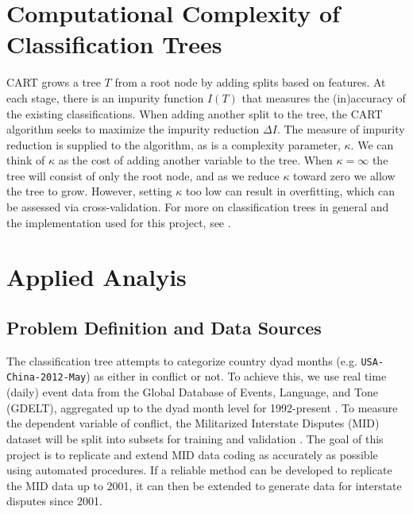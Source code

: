 \documentclass[12pt,letterpaper]{article}
\begin{document}
\section{Computational Complexity of Classification Trees}
\label{complexity}

CART grows a tree $T$ from a root node by adding splits based on features. At each stage, there is an impurity function $I(T)$ that measures the (in)accuracy of the existing classifications. When adding another split to the tree, the CART algorithm seeks to maximize the impurity reduction $\Delta I$. The measure of impurity reduction is supplied to the algorithm, as is a complexity parameter, $\kappa$. We can think of $\kappa$ as the cost of adding another variable to the tree. When $\kappa=\infty$ the tree will consist of only the root node, and as we reduce $\kappa$ toward zero we allow the tree to grow. However, setting $\kappa$ too low can result in overfitting, which can be assessed via cross-validation. For more on classification trees in general and the implementation used for this project, see \citep{murphy2012machine,olshen1984classification,therneau1997introduction}. 


\section{Applied Analyis}
\label{analysis}

\subsection{Problem Definition and Data Sources}

The classification tree attempts to categorize country dyad months (e.g. \texttt{USA-China-2012-May}) as either in conflict or not. To achieve this, we use real time (daily) event data from the Global Database of Events, Language, and Tone (GDELT), aggregated up to the dyad month level for 1992-present \citep{schrodt2013gdelt}. To measure the dependent variable of conflict, the Militarized Interstate Disputes (MID) dataset will be split into subsets for training and validation \citep{ghosn2004mid3}. The goal of this project is to replicate and extend MID data coding as accurately as possible using automated procedures. If a reliable method can be developed to replicate the MID data up to 2001, it can then be extended to generate data for interstate disputes since 2001. 
\end{document}
